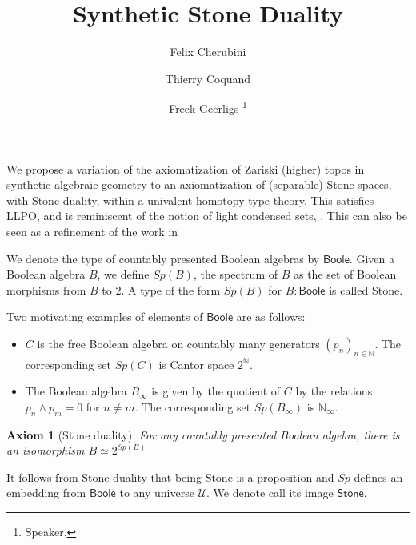 \documentclass[letterpaper]{../../util/easychair}
\title{Synthetic Stone Duality 
}
\author{
Felix Cherubini \inst{1}
\and 
 Thierry Coquand \inst{2}%
\and 
 Freek Geerligs \inst{3}
 \thanks{Speaker.}%
}
\institute{
  University of Gothenburg\\
  \email{felix.cherubini@posteo.de}
\and
  University of Gothenburg\\
  \email{Thierry.Coquand@cse.gu.se}
\and
  University of Gothenburg\\
  \email{geerligs@chalmers.se}
}
\newtheorem{axiom}{Axiom}
\newcommand{\N}{\mathbb{N}}
\newcommand{\Boole}{\mathsf{Boole}}
\newcommand{\Stone}{\mathsf{Stone}}
\newcommand{\Noo}{\N_{\infty}}
\begin{document}
\maketitle
We propose a variation of
the axiomatization of Zariski (higher) topos in synthetic algebraic geometry \cite{draft}
to an axiomatization of (separable) Stone spaces, with Stone duality,
within a univalent homotopy type theory.  This satisfies LLPO, and is reminiscent
of the notion of light condensed sets, \cite{Scholze}. 
This can also be seen as a refinement of the work in \cite{XuE13}

\medskip

We denote the type of countably presented Boolean algebras by $\Boole$.
Given a Boolean algebra $B$, we define $Sp(B)$, the spectrum of $B$ as the set of 
Boolean morphisms from $B$ to $2$. 
 A type of the form $Sp(B)$ for $B:\Boole$ is called Stone.


 Two motivating examples of elements of $\Boole$ are as follows:
 \begin{itemize}
   \item $C$ is the free Boolean algebra on countably many generators $(p_n)_{n\in\mathbb N}$. 
     The corresponding set $Sp(C)$ is Cantor space $2^\mathbb N$. 
   \item The Boolean algebra $ B_\infty$ is given by the quotient of $C$ by the relations $p_n\wedge p_m = 0$ for $n\neq m$. 
 The corresponding set $Sp(B_\infty)$ is $\Noo$. 
  \end{itemize} 

\begin{axiom}[Stone duality]
  For any countably presented Boolean algebra, there is an isomorphism $B \simeq 2^{Sp(B)}$
\end{axiom}
It follows from Stone duality that being Stone is a proposition and $Sp$ defines an embedding from $\Boole$ 
to any universe $\mathcal U$. We denote call its image $\Stone$. 
\end{document}
